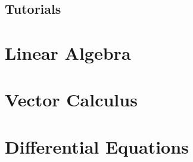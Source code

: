 \documentclass[12pt,letterpaper,twoside,openany]{book}
\begin{document}
 
\frontmatter



 
\clearpage
\thispagestyle{empty}
 
\tableofcontents
 
\mainmatter
% 

\chapter{Tutorials}


\part{Linear Algebra}


\part{Vector Calculus}


\part{Differential Equations}

 

\printindex 

 
\end{document}
